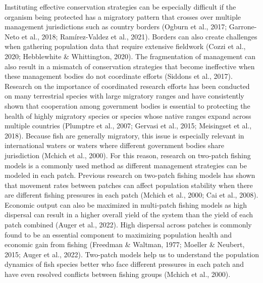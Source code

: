 \documentclass[
  12pt,
]{article}
\begin{document}
Instituting effective conservation strategies can be especially difficult if the organism being protected has a migratory pattern that crosses over multiple management jurisdictions such as country borders (Ogburn et al., 2017; Garrone-Neto et al., 2018; Ramírez-Valdez et al., 2021). Borders can also create challenges when gathering population data that require extensive fieldwork (Cozzi et al., 2020; Hebblewhite \& Whittington, 2020). The fragmentation of management can also result in a mismatch of conservation strategies that become ineffective when these management bodies do not coordinate efforts (Siddons et al., 2017). Research on the importance of coordinated research efforts has been conducted on many terrestrial species with large migratory ranges and have consistently shown that cooperation among government bodies is essential to protecting the health of highly migratory species or species whose native ranges expand across multiple countries (Plumptre et al., 2007; Gervasi et al., 2015; Meisingset et al., 2018). Because fish are generally migratory, this issue is especially relevant in international waters or waters where different government bodies share jurisdiction (Mchich et al., 2000). For this reason, research on two-patch fishing models is a commonly used method as different management strategies can be modeled in each patch. Previous research on two-patch fishing models has shown that movement rates between patches can affect population stability when there are different fishing pressures in each patch (Mchich et al., 2000; Cai et al., 2008). Economic output can also be maximized in multi-patch fishing models as high dispersal can result in a higher overall yield of the system than the yield of each patch combined (Auger et al., 2022). High dispersal across patches is commonly found to be an essential component to maximizing population health and economic gain from fishing (Freedman \& Waltman, 1977; Moeller \& Neubert, 2015; Auger et al., 2022). Two-patch models help us to understand the population dynamics of fish species better who face different pressures in each patch and have even resolved conflicts between fishing groups (Mchich et al., 2000).
\end{document}
